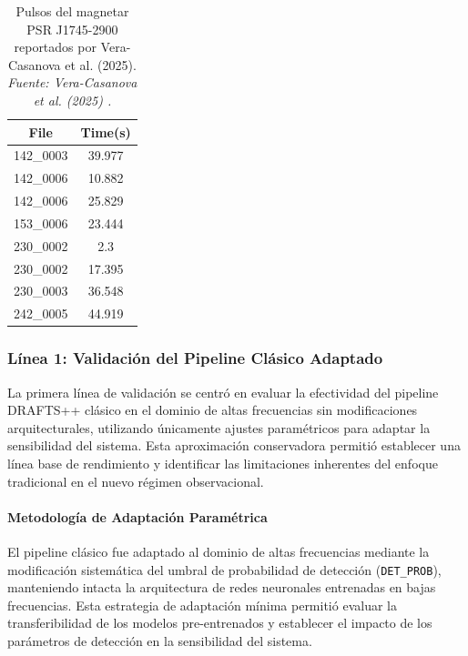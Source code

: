 \begin{table}[H]
    \centering
    \caption{Pulsos del magnetar PSR J1745-2900 reportados por Vera-Casanova et al. (2025). \textit{Fuente: Vera-Casanova et al. (2025) \cite{veracasanova2025}.}}
    \label{tab:veracasanova_reference}
    \begin{tabular}{|c|c|}
        \hline
        \textbf{File} & \textbf{Time(s)} \\
        \hline
        142\_0003 & 39.977 \\
        142\_0006 & 10.882 \\
        142\_0006 & 25.829 \\
        153\_0006 & 23.444 \\
        230\_0002 & 2.3 \\
        230\_0002 & 17.395 \\
        230\_0003 & 36.548 \\
        242\_0005 & 44.919 \\
        \hline
    \end{tabular}
\end{table}

\subsubsection{Línea 1: Validación del Pipeline Clásico Adaptado}

La primera línea de validación se centró en evaluar la efectividad del pipeline DRAFTS++ clásico en el dominio de altas frecuencias sin modificaciones arquitecturales, utilizando únicamente ajustes paramétricos para adaptar la sensibilidad del sistema. Esta aproximación conservadora permitió establecer una línea base de rendimiento y identificar las limitaciones inherentes del enfoque tradicional en el nuevo régimen observacional.

\paragraph{Metodología de Adaptación Paramétrica}

El pipeline clásico fue adaptado al dominio de altas frecuencias mediante la modificación sistemática del umbral de probabilidad de detección (\texttt{DET\_PROB}), manteniendo intacta la arquitectura de redes neuronales entrenadas en bajas frecuencias. Esta estrategia de adaptación mínima permitió evaluar la transferibilidad de los modelos pre-entrenados y establecer el impacto de los parámetros de detección en la sensibilidad del sistema.

